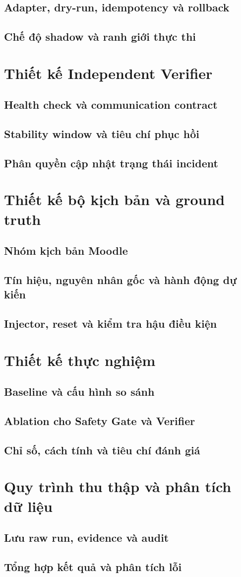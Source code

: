 \subsection{Adapter, dry-run, idempotency và rollback}
\subsection{Chế độ shadow và ranh giới thực thi}

\section{Thiết kế Independent Verifier}
\subsection{Health check và communication contract}
\subsection{Stability window và tiêu chí phục hồi}
\subsection{Phân quyền cập nhật trạng thái incident}

\section{Thiết kế bộ kịch bản và ground truth}
\subsection{Nhóm kịch bản Moodle}
\subsection{Tín hiệu, nguyên nhân gốc và hành động dự kiến}
\subsection{Injector, reset và kiểm tra hậu điều kiện}

\section{Thiết kế thực nghiệm}
\subsection{Baseline và cấu hình so sánh}
\subsection{Ablation cho Safety Gate và Verifier}
\subsection{Chỉ số, cách tính và tiêu chí đánh giá}

\section{Quy trình thu thập và phân tích dữ liệu}
\subsection{Lưu raw run, evidence và audit}
\subsection{Tổng hợp kết quả và phân tích lỗi}
